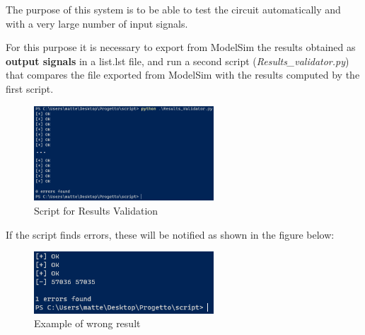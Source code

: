 The purpose of this system is to be able to test the circuit automatically and with a very large number of input signals.

For this purpose it is necessary to export from ModelSim the results obtained as \textbf{output signals} in a list.lst file, and run a second script (\textit{Results\_validator.py}) that compares the file exported from ModelSim with the results computed by the first script.

\begin{figure}[H]
    \centering
    \includegraphics[width=0.6\textwidth]{img/Chapter4/Validator.png}
    \caption{Script for Results Validation}
    \label{fig:Script2}
\end{figure}

If the script finds errors, these will be notified as shown in the figure below:

\begin{figure}[H]
    \centering
    \includegraphics[width=0.6\textwidth]{img/Chapter4/Validator2.png}
    \caption{Example of wrong result}
    \label{fig:Script3}
\end{figure}